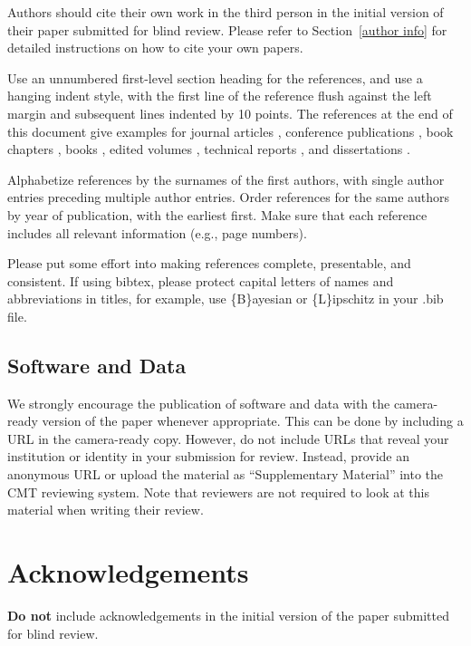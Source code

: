 \documentclass{article}
\begin{document}
Authors should cite their own work in the third person
in the initial version of their paper submitted for blind review.
Please refer to Section~\ref{author info} for detailed instructions on how to
cite your own papers.

Use an unnumbered first-level section heading for the references, and use a
hanging indent style, with the first line of the reference flush against the
left margin and subsequent lines indented by 10 points. The references at the
end of this document give examples for journal articles \cite{Samuel59},
conference publications \cite{langley00}, book chapters \cite{Newell81}, books
\cite{DudaHart2nd}, edited volumes \cite{MachineLearningI}, technical reports
\cite{mitchell80}, and dissertations \cite{kearns89}.

Alphabetize references by the surnames of the first authors, with
single author entries preceding multiple author entries. Order
references for the same authors by year of publication, with the
earliest first. Make sure that each reference includes all relevant
information (e.g., page numbers).

Please put some effort into making references complete, presentable, and
consistent. If using bibtex, please protect capital letters of names and
abbreviations in titles, for example, use \{B\}ayesian or \{L\}ipschitz
in your .bib file.

\subsection{Software and Data}

We strongly encourage the publication of software and data with the
camera-ready version of the paper whenever appropriate. This can be
done by including a URL in the camera-ready copy. However, do not
include URLs that reveal your institution or identity in your
submission for review. Instead, provide an anonymous URL or upload
the material as ``Supplementary Material'' into the CMT reviewing
system. Note that reviewers are not required to look at this material
when writing their review.

\section*{Acknowledgements}

\textbf{Do not} include acknowledgements in the initial version of
the paper submitted for blind review.
\end{document}
